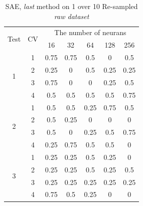 \documentclass[draft,dvipsnames]{drexel-thesis}
\begin{document}
\begin{thesis}
\begin{table}[!t]
\centering
\caption{SAE, {\em last} method on 1 over 10 Re-sampled {\em raw dataset}}
\label{tbl:sae_last_1_10}
\begin{tabular}{|c|c|c|c|c|c|c|}
\hline
\multirow{2}{*}{Test} & \multirow{2}{*}{CV} & \multicolumn{5}{c|}{The number of neurans}                               \\ \cline{3-7}
                      &                     & 16           & 32           & 64           & 128          & 256          \\ \hline
\multirow{4}{*}{1}    & 1                   & 0.75         & 0.75         & 0.5          & 0            & 0.5          \\ \cline{2-7}
                      & 2                   & 0.25         & 0            & 0.5          & 0.25         & 0.25         \\ \cline{2-7}
                      & 3                   & 0.75         & 0            & 0            & 0.25         & 0.5          \\ \cline{2-7}
                      & 4                   & 0.5          & 0.5          & 0.5          & 0.5          & 0.75         \\ \hline
\multirow{4}{*}{2}    & 1                   & 0.5          & 0.5          & 0.25         & 0.75         & 0.5          \\ \cline{2-7}
                      & 2                   & 0.5          & 0.25         & 0            & 0            & 0            \\ \cline{2-7}
                      & 3                   & 0.5          & 0            & 0.25         & 0.5          & 0.75         \\ \cline{2-7}
                      & 4                   & 0.25         & 0.75         & 0.5          & 0.5          & 0            \\ \hline
\multirow{4}{*}{3}    & 1                   & 0.25         & 0.25         & 0.5          & 0.25         & 0            \\ \cline{2-7}
                      & 2                   & 0.25         & 0.25         & 0.5          & 0.25         & 0.5          \\ \cline{2-7}
                      & 3                   & 0.25         & 0.25         & 0.25         & 0.25         & 0.25         \\ \cline{2-7}
                      & 4                   & 0.75         & 0.5          & 0.25         & 0            & 0            \\ \hline

\end{tabular}
\end{table}
\end{thesis}
\end{document}
